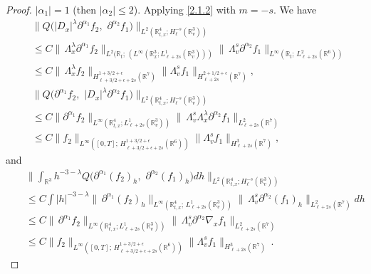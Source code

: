 \documentclass{amsart}[12pt, article]
\begin{document}
\begin{proof}
  $|\alpha_1|=1$ (then $|\alpha_2|\leq 2$).
Applying \eqref{2.1.2} with $m=-s$. We have
\begin{align*}
&\Big\|Q\Big(|D_{x}|^\lambda\partial^{\alpha_1} f_2,\,\,
\partial^{\alpha_2} f_1\Big)\Big\|_{L^2({{{\mathbb R}}}^4_{t, x}; H^{-s}_{\ell}({{{\mathbb R}}}^3_v))}
\\
&\leq C\|\,\Lambda_{x}^{\lambda}
\partial^{\alpha_1} f_2\|_{L^2({{{\mathbb R}}}_t;\, (L^\infty({{{\mathbb R}}}^3_{x};
L^1_{\ell +2s}({{{\mathbb R}}}^3_v)))}\|\,\Lambda_v^{s}
\partial^{\alpha_2} f_1\|_{L^\infty({{{\mathbb R}}}_t;\, L^2_{\ell+2s}({{{\mathbb R}}}^6))}
\\
&\leq C\|\,\Lambda_{x}^{\lambda}f_2\|_{H^{1+3/2+
\epsilon}_{\ell+3/2+\epsilon+2s}({{{\mathbb R}}}^7)}\|\Lambda_v^s
f_1\|_{H^{2+1/2+\epsilon}_{\ell +2s}({{{\mathbb R}}}^7)},
\\
&\Big\|Q\Big(\partial^{\alpha_1} f_2,\,\, |D_{ x}|^\lambda
\partial^{\alpha_2} f_1\Big)\Big\|_{L^2({{{\mathbb R}}}^4_{t, x};
H^{-s}_{\ell}({{{\mathbb R}}}^3_v))}\\
&\leq C\|
\partial^{\alpha_1} f_2\|_{L^\infty({{{\mathbb R}}}^4_{t, x};
L^1_{\ell +2s}({{{\mathbb R}}}^3_v))}\|\,\Lambda_v^{s} \Lambda_{x}^{\lambda}
\partial^{\alpha_2} f_1\|_{L^2_{\ell+2s}({{{\mathbb R}}}^7)}
\\
&\leq C\|f_2\|_{L^\infty([0,
T];\,H^{1+3/2+\epsilon}_{\ell+3/2+\epsilon+2s}({{{\mathbb R}}}^6))}\|\Lambda_v^s
f_1\|_{H^{3}_{\ell +2s}({{{\mathbb R}}}^7)},
\end{align*}
and
\begin{eqnarray*}
&&\Big\|\int_{{{{\mathbb R}}}^3}h^{-3-\lambda}Q\Big(\partial^{\alpha_1}
(f_2)_h,\,\,
\partial^{\alpha_2} (f_1)_h\Big) dh\Big\|_{L^2({{{\mathbb R}}}^4_{t, x};
H^{-s}_{\ell}({{{\mathbb R}}}^3_v))}\\
&&\leq C\int |h|^{-3-\lambda}\|\,\partial^{\alpha_1}
(f_2)_h\|_{L^\infty({{{\mathbb R}}}^4_{t, x};\, L^1_{\ell
+2s}({{{\mathbb R}}}^3_v))}\|\,\Lambda_v^{s}
\partial^{\alpha_2} (f_1)_h\|_{L^2_{\ell+2s}({{{\mathbb R}}}^7)}dh\\
&&\leq C\|\,\partial^{\alpha_1} f_2\|_{L^\infty({{{\mathbb R}}}^4_{t, x};
L^1_{\ell+2s}({{{\mathbb R}}}^3_v))}\|\,\Lambda_v^{s}
\partial^{\alpha_2} \nabla_{x}f_1\|_{L^2_{\ell +2s}({{{\mathbb R}}}^7)}
\\
&&\leq C\|f_2\|_{L^\infty([0,
T];\,H^{1+3/2+\epsilon}_{\ell+3/2+\epsilon+2s}({{{\mathbb R}}}^6))}\|\Lambda_v^s
f_1\|_{H^{3}_{\ell +2s}({{{\mathbb R}}}^7)}\,.
\end{eqnarray*}


\end{proof}
\end{document}
